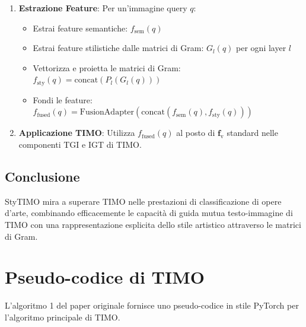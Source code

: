 \documentclass[11pt,a4paper]{article}
\newcommand{\fv}{\mathbf{f}_\text{v}}      %
\begin{document}
\begin{enumerate}
    \item \textbf{Estrazione Feature}: Per un'immagine query $q$:
    \begin{itemize}
        \item Estrai feature semantiche: $f_{\text{sem}}(q)$
        \item Estrai feature stilistiche dalle matrici di Gram: $G_l(q)$ per ogni layer $l$
        \item Vettorizza e proietta le matrici di Gram: $f_{\text{sty}}(q) = \text{concat}(P_l(G_l(q)))$
        \item Fondi le feature: $f_{\text{fused}}(q) = \text{FusionAdapter}(\text{concat}(f_{\text{sem}}(q), f_{\text{sty}}(q)))$
    \end{itemize}
    
    \item \textbf{Applicazione TIMO}: Utilizza $f_{\text{fused}}(q)$ al posto di $\fv$ standard nelle componenti TGI e IGT di TIMO.
\end{enumerate}

\subsection{Conclusione}

StyTIMO mira a superare TIMO nelle prestazioni di classificazione di opere d'arte, combinando efficacemente le capacità di guida mutua testo-immagine di TIMO con una rappresentazione esplicita dello stile artistico attraverso le matrici di Gram.

\newpage
\appendix
\section{Pseudo-codice di TIMO}
L'algoritmo 1 del paper originale fornisce uno pseudo-codice in stile PyTorch per l'algoritmo principale di TIMO.
\end{document}
